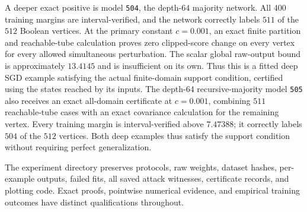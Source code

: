 A deeper exact positive is model \texttt{504}, the depth-$64$ majority
network. All $400$ training margins are interval-verified, and the
network correctly labels $511$ of the $512$ Boolean vertices. At the
primary constant $c=0.001$, an exact finite partition and reachable-tube
calculation proves zero clipped-score change on every vertex for every
allowed simultaneous perturbation. The scalar global raw-output bound
is approximately $13.4145$ and is insufficient on its own. Thus this
is a fitted deep SGD example satisfying the actual finite-domain
support condition, certified using the states reached by its inputs.
The depth-$64$ recursive-majority model \texttt{505} also receives an
exact all-domain certificate at $c=0.001$, combining $511$ reachable-tube
cases with an exact covariance calculation for the remaining vertex.
Every training margin is interval-verified above $7.47388$; it correctly
labels $504$ of the $512$ vertices. Both deep examples thus satisfy the
support condition without requiring perfect generalization.


The experiment directory preserves protocols, raw weights, dataset
hashes, per-example outputs, failed fits, all saved attack witnesses,
certificate records, and plotting code. Exact proofs, pointwise
numerical evidence, and empirical training outcomes have distinct
qualifications throughout.
